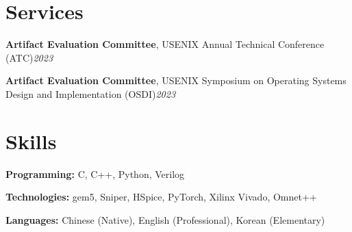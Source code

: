 \documentclass[letterpaper,11pt]{article}
\newcommand{\resumeSubHeadingListStart}{\begin{itemize}[leftmargin=0.15in, label={}]}
\newcommand{\resumeSubHeadingListEnd}{\end{itemize}}
\begin{document}

\section{Services}
  \vspace{2pt}
  \resumeSubHeadingListStart
    \small{\item{
        \textbf{Artifact Evaluation Committee}, USENIX Annual Technical Conference (ATC)\hfill \textit{2023} \\ \vspace{3pt}
        
        \textbf{Artifact Evaluation Committee}, USENIX Symposium on Operating Systems Design and Implementation (OSDI)\hfill \textit{2023} \\ \vspace{3pt}
    }}
  \resumeSubHeadingListEnd


\section{Skills}
  \vspace{2pt}
  \resumeSubHeadingListStart
    \small{\item{
        \textbf{Programming:}{ C, C++, Python, Verilog} \\ \vspace{3pt}
        
        \textbf{Technologies:}{ gem5, Sniper, HSpice, PyTorch, Xilinx Vivado, Omnet++} \\ \vspace{3pt}
        
        \textbf{Languages:}{ Chinese (Native), English (Professional), Korean (Elementary)}
        
    }}
  \resumeSubHeadingListEnd




        
\end{document}
